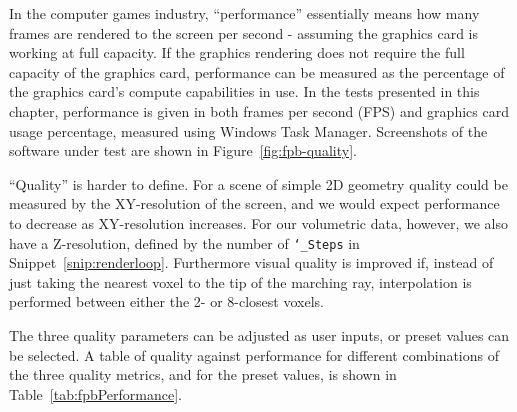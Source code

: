 In the computer games industry, ``performance'' essentially means how many frames are rendered to the screen per second - assuming the graphics card is working at full capacity.
If the graphics rendering does not require the full capacity of the graphics card, performance can be measured as the percentage of the graphics card's compute capabilities in use.
In the tests presented in this chapter, performance is given in both frames per second (FPS) and graphics card usage percentage, measured using Windows Task Manager.
Screenshots of the software under test are shown in Figure~\ref{fig:fpb-quality}.

``Quality'' is harder to define.
For a scene of simple 2D geometry quality could be measured by the XY-resolution of the screen, and we would expect performance to decrease as XY-resolution increases.
For our volumetric data, however, we also have a Z-resolution, defined by the number of \texttt{\char`_Steps} in Snippet~\ref{snip:renderloop}.
Furthermore visual quality is improved if, instead of just taking the nearest voxel to the tip of the marching ray, interpolation is performed between either the 2- or 8-closest voxels.

The three quality parameters can be adjusted as user inputs, or preset values can be selected.
A table of quality against performance for different combinations of the three quality metrics, and for the preset values, is shown in Table~\ref{tab:fpbPerformance}.


